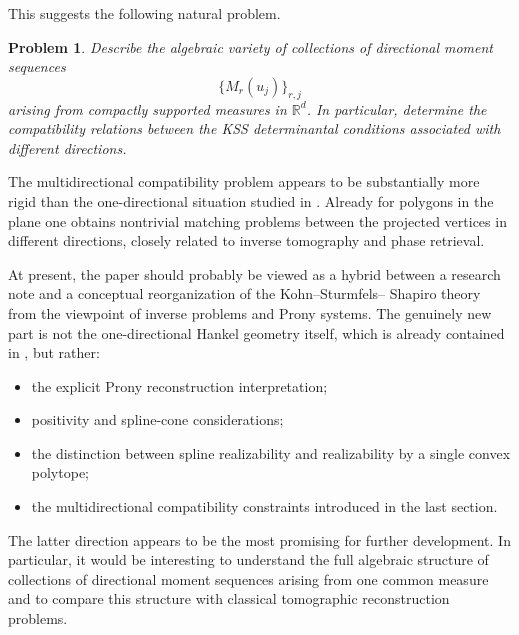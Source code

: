 \documentclass[reqno]{amsart}
\numberwithin{theorem}{section}
\newtheorem{problem}[theorem]{Problem}
\newcommand{\RR}{\mathbb{R}}
\begin{document}
This suggests the following natural problem.

\begin{problem}
Describe the algebraic variety of collections of directional moment
sequences
\[
\{M_r(u_j)\}_{r,j}
\]
arising from compactly supported measures in $\RR^d$.
In particular, determine the compatibility relations between the KSS
determinantal conditions associated with different directions.
\end{problem}

The multidirectional compatibility problem appears to be substantially more
rigid than the one-directional situation studied in \cite{KSS}.  Already
for polygons in the plane one obtains nontrivial matching problems between
the projected vertices in different directions, closely related to inverse
tomography and phase retrieval.







At present, the paper should probably be viewed as a hybrid between a
research note and a conceptual reorganization of the Kohn--Sturmfels--
Shapiro theory from the viewpoint of inverse problems and Prony systems.
The genuinely new part is not the one-directional Hankel geometry itself,
which is already contained in \cite{KSS}, but rather:
\begin{itemize}
\item the explicit Prony reconstruction interpretation;
\item positivity and spline-cone considerations;
\item the distinction between spline realizability and realizability by a
single convex polytope;
\item the multidirectional compatibility constraints introduced in the last
section.
\end{itemize}

The latter direction appears to be the most promising for further
development.  In particular, it would be interesting to understand the full
algebraic structure of collections of directional moment sequences arising
from one common measure and to compare this structure with classical
tomographic reconstruction problems.
\end{document}

